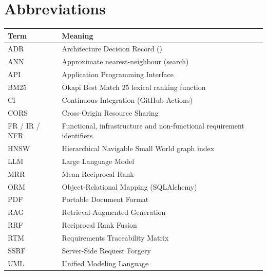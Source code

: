 \chapter*{Abbreviations}

\begin{tabularx}{\textwidth}{@{}lL@{}}
\toprule
\textbf{Term} & \textbf{Meaning} \\
\midrule
ADR & Architecture Decision Record () \\
ANN & Approximate nearest-neighbour (search) \\
API & Application Programming Interface \\
BM25 & Okapi Best Match 25 lexical ranking function \\
CI & Continuous Integration (GitHub Actions) \\
CORS & Cross-Origin Resource Sharing \\
FR / IR / NFR & Functional, infrastructure and non-functional requirement identifiers \\
HNSW & Hierarchical Navigable Small World graph index \\
LLM & Large Language Model \\
MRR & Mean Reciprocal Rank \\
ORM & Object-Relational Mapping (SQLAlchemy) \\
PDF & Portable Document Format \\
RAG & Retrieval-Augmented Generation \\
RRF & Reciprocal Rank Fusion \\
RTM & Requirements Traceability Matrix \\
SSRF & Server-Side Request Forgery \\
UML & Unified Modeling Language \\
\bottomrule
\end{tabularx}
